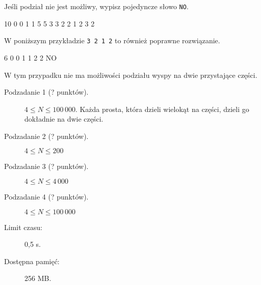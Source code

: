 \documentclass{boi2014-pl}
\newcommand{\constant}[1]{{\tt #1}}
\begin{document}
        Jeśli podział nie jest możliwy, wypisz pojedyncze słowo \constant{NO}.

    \clearpage

    \Examples
	\example
	{
		10  0  0  1  1  5  5  3  3  2  2
	}
	{
		1 2 3 2
	}
	{
        W poniższym przykładzie {\tt 3 2 1 2} to również poprawne rozwiązanie.
	
        \begin{center}
        \end{center}
        }

	\example
	{
		6  0  0  1  1  2  2
	}
	{
		NO
	}
        {
        W tym przypadku nie ma możliwości podziału wyspy na dwie przystające części.
        \begin{center}
        \end{center}
        }

    \Scoring

    \begin{description}
        \item[Podzadanie 1 (? punktów).] $4 \le N \le 100\,000$.
        Każda prosta, która dzieli wielokąt na części, dzieli go dokładnie na dwie części.
        \item[Podzadanie 2 (? punktów).] $4 \le N \le 200$
        \item[Podzadanie 3 (? punktów).] $4 \le N \le 4\, 000$
        \item[Podzadanie 4 (? punktów).] $4 \le N \le 100\, 000$
    \end{description}

    \Constraints

    \begin{description}
        \item[Limit czasu:] 0,5 s.
        \item[Dostępna pamięć:] 256 MB.
    \end{description}
\end{document}
